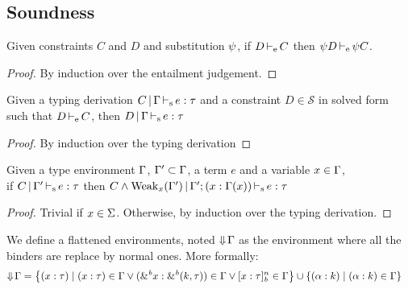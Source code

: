 \newcommand\mcase[1]{\noindent\textbf{Case }#1\\\noindent}

\subsection{Soundness}

\begin{lemma}
  \label{lemma:constrsubst}
  Given constraints $C$ and $D$ and substitution $\mathrm{\psi}$, if $D \operatorname{\vdash_e} C$
  then $\mathrm{\psi} D \operatorname{\vdash_e} \mathrm{\psi} C$.
  \begin{proof}
    By induction over the entailment judgement.
  \end{proof}
\end{lemma}

\begin{lemma}
  \label{lemma:constrimply}
  Given a typing derivation $C \operatorname{|} \Gamma \operatorname{\vdash_s} e : \tau$ and
  a constraint $D \in \mathcal S$ in solved form such that $D \operatorname{\vdash_e} C$, then
  $D \operatorname{|} \Gamma \operatorname{\vdash_s} e : \tau$
  \begin{proof}
    By induction over the typing derivation
  \end{proof}
\end{lemma}


\begin{lemma}
  \label{lemma:typ:weakening}
  Given a type environment $\Gamma$, $\Gamma' \subset \Gamma$, a term $e$ and a variable $x\in\Gamma$,\\
  if $C \operatorname{|} \Gamma' \operatorname{\vdash_s} e : \tau$
  then $C\wedge \operatorname{Weak}_{x}(\Gamma') \operatorname{|} \Gamma';(x : \Gamma(x)) \operatorname{\vdash_s} e : \tau$

  \begin{proof}
    Trivial if $x \in \Sigma$. Otherwise, by induction over the typing derivation.
  \end{proof}
\end{lemma}


We define a flattened environments, noted $\Downarrow\!\Gamma$ as the environment
where all the binders are replace by normal ones. More formally:
\begin{align*}
  \Downarrow\!\Gamma
  &= \left\{ (x : \tau) \mid
    (x : \tau)\in\Gamma
    \vee ({\&}^{\textit{b}}x : {\&}^{\textit{b}}(k,\tau))\in\Gamma
    \vee [x : \tau]_{\textit{b}}^n\in\Gamma
    \right\} \cup \left\{ (\alpha : k) \mid (\alpha : k)\in\Gamma \right\}
\end{align*}

